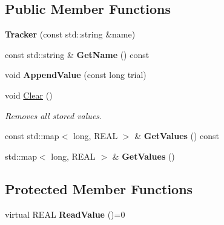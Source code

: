 \subsection*{Public Member Functions}
\begin{DoxyCompactItemize}
\item 
\mbox{\label{class_obj_cryst_1_1_tracker_a57d89249ba910902e6ef6a33dcd3ee8c}} 
{\bfseries Tracker} (const std\+::string \&name)
\item 
\mbox{\label{class_obj_cryst_1_1_tracker_aef4f9c81fa60958dfac2990a4cc76882}} 
const std\+::string \& {\bfseries Get\+Name} () const
\item 
\mbox{\label{class_obj_cryst_1_1_tracker_ae50d08700a131d280f8a19a58274bfe7}} 
void {\bfseries Append\+Value} (const long trial)
\item 
\mbox{\label{class_obj_cryst_1_1_tracker_abdac1cff42cfd8d66e10977a5a9066b3}} 
void \mbox{\hyperlink{class_obj_cryst_1_1_tracker_abdac1cff42cfd8d66e10977a5a9066b3}{Clear}} ()
\begin{DoxyCompactList}\small\item\em Removes all stored values. \end{DoxyCompactList}\item 
\mbox{\label{class_obj_cryst_1_1_tracker_ab12afd9c957667a67ad2590b1d47c705}} 
const std\+::map$<$ long, R\+E\+AL $>$ \& {\bfseries Get\+Values} () const
\item 
\mbox{\label{class_obj_cryst_1_1_tracker_a1f9df918e6a5a4e1263058a8e137e3ff}} 
std\+::map$<$ long, R\+E\+AL $>$ \& {\bfseries Get\+Values} ()
\end{DoxyCompactItemize}
\subsection*{Protected Member Functions}
\begin{DoxyCompactItemize}
\item 
\mbox{\label{class_obj_cryst_1_1_tracker_a14096d99b76d3ffac16553f6434f97ce}} 
virtual R\+E\+AL {\bfseries Read\+Value} ()=0
\end{DoxyCompactItemize}
